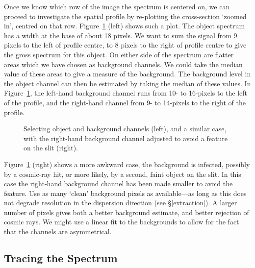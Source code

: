\documentclass[twoside,11pt]{article}
\newcommand{\htmlref}[2]{#1}
\newcommand{\xlabel}[1]{}
\newcommand{\mlabel}[1]{\xlabel{#1}\label{#1}}
\newcommand{\scspec}[2]{#1}
\newcommand{\scspec}[2]{#2}
\begin{document}
Once we know which row of the image the spectrum is centered on, we can
proceed to investigate the spatial profile by re-plotting the
cross-section
`zoomed in', centred on that row.
\scspec{Figure~\ref{fi_channel_select}}{The first figure below}
(left) shows such a plot.
The object spectrum has a width at the base of about 18 pixels.
We want to sum the signal from 9 pixels to the left of profile
centre, to 8 pixels to the right of profile centre to give the
gross spectrum for this object.
On either side of the spectrum are flatter areas which we have
chosen as background channels.
We could take the median value of these areas to give a measure
of the background.
The background level in the object channel can then be estimated
by taking the median of these values.
In \scspec{Figure~\ref{fi_channel_select}}{the first figure below},
the left-hand background channel runs from 10- to 16-pixels to the
left of the profile, and the right-hand channel from 9- to 14-pixels
to the right of the profile.

\begin{figure}
\begin{center}
  \scspec{\leavevmode\epsfysize=55mm\epsfbox{sc7_03.eps}}
         {\leavevmode\epsfysize=66mm}

  \parbox{140mm}{
    \caption{Selecting object and background channels (left), and a
             similar case, with the right-hand background channel
	     adjusted to avoid a feature on the slit (right).}
    \label{fi_channel_select}
  }
\end{center}
\end{figure}

\scspec{Figure~\ref{fi_channel_select}}{The figure above} (right)
shows a more awkward case, the background is infected,
possibly by a \htmlref{cosmic-ray hit}{gl_cosmic_ray},
or more likely, by a second, faint object on the slit.
In this case the right-hand background channel has been made
smaller to avoid the feature.
Use as many `clean' background pixels as available\scspec{---}{ - }as
long as this does not degrade resolution in the dispersion direction
(see \scspec{\S\ref{extraction}}
{\htmlref{{\sl{Extracting the Spectrum}}}{extraction}}).
A larger number of pixels gives both a better background
estimate, and better rejection of cosmic rays.
We might use a linear fit to the backgrounds to allow for the fact
that the channels are asymmetrical.


\subsection{\mlabel{tracing}Tracing the Spectrum}
\end{document}
